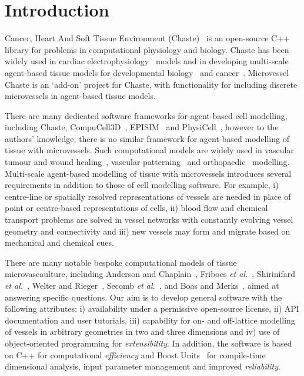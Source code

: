 \documentclass[10pt,letterpaper]{article}
\begin{document}
\linenumbers

\section*{Introduction}
Cancer, Heart And Soft Tissue Environment (Chaste)~\cite{Mirams2013} is an open-source C++ library for problems in computational physiology and biology. Chaste has been widely used in cardiac electrophysiology~\cite{Cooper2015} models and in developing multi-scale agent-based tissue models for developmental biology~\cite{Tetley2016} and cancer~\cite{Dunn2016}. Microvessel Chaste is an `add-on' project for Chaste, with functionality for including discrete microvessels in agent-based tissue models.

There are many dedicated software frameworks for agent-based cell modelling, including Chaste, CompuCell3D~\cite{Swat2012}, EPISIM~\cite{Sutterlin2013} and PhysiCell~\cite{Macklin2012}, however to the authors' knowledge, there is no similar framework for agent-based modelling of tissue with microvessels. Such computational models are widely used in vascular tumour and wound healing~\cite{Owen2011}, vascular patterning~\cite{Secomb2013} and orthopaedic~\cite{Carlier2012} modelling. Multi-scale agent-based modelling of tissue with microvessels introduces several requirements in addition to those of cell modelling software. For example, i) centre-line or spatially resolved representations of vessels are needed in place of point or centre-based representations of cells, ii) blood flow and chemical transport problems are solved in vessel networks with constantly evolving vessel geometry and connectivity and iii) new vessels may form and migrate based on mechanical and chemical cues. 

There are many notable bespoke computational models of tissue microvascaulture, including Anderson and Chaplain~\cite{Anderson1998}, Friboes \emph{et al.}~\cite{Frieboes2007}, Shirinifard \emph{et al.}~\cite{Shirinifard2009}, Welter and Rieger~\cite{Welter2013}, Secomb \emph{et al.}~\cite{Secomb2013}, and Boas and Merks~\cite{Boas2015}, aimed at answering specific questions. Our aim is to develop general software with the following attributes: i) availability under a permissive open-source license, ii) API documentation and user tutorials, iii) capability for on- and off-lattice modelling of vessels in arbitrary geometries in two and three dimensions and iv) use of object-oriented programming for \emph{extensibility}. In addition, the software is based on C++ for computational \emph{efficiency} and Boost Units~\cite{boost161} for compile-time dimensional analysis, input parameter management and improved \emph{reliability}. 
\end{document}
